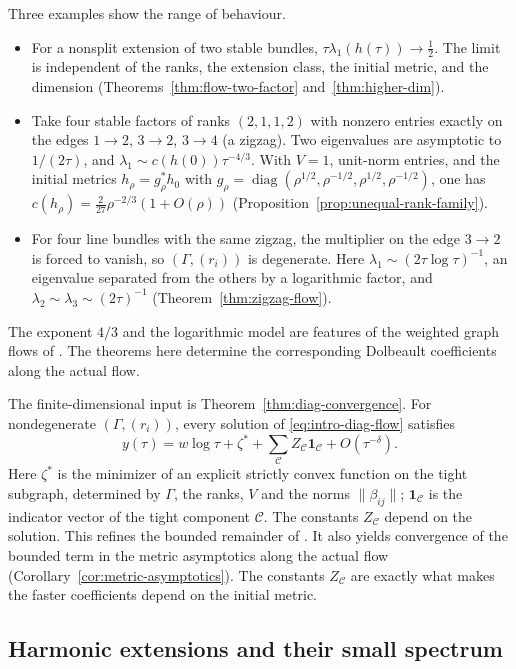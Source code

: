 \documentclass[11pt]{amsart}
\theoremstyle{definition}
\theoremstyle{remark}
\newcommand{\diag}{\operatorname{diag}}
\begin{document}
Three examples show the range of behaviour.
\begin{itemize}
\item For a nonsplit extension of two stable bundles,
 $\tau\lambda_1(h(\tau))\to\frac12$. The limit is independent of the ranks,
 the extension class, the initial metric, and the dimension
 (Theorems~\ref{thm:flow-two-factor} and~\ref{thm:higher-dim}).
\item Take four stable factors of ranks $(2,1,1,2)$ with nonzero entries
 exactly on the edges $1\to2$, $3\to2$, $3\to4$ (a zigzag). Two eigenvalues
 are asymptotic to $1/(2\tau)$, and $\lambda_1\sim c(h(0))\tau^{-4/3}$. With
 $V=1$, unit-norm entries, and the initial metrics $h_\rho=g_\rho^*h_0$ with
 $g_\rho=\diag(\rho^{1/2},\rho^{-1/2},\rho^{1/2},\rho^{-1/2})$, one has
 $c(h_\rho)=\frac2{27}\rho^{-2/3}(1+O(\rho))$
 (Proposition~\ref{prop:unequal-rank-family}).
\item For four line bundles with the same zigzag, the multiplier on the edge
 $3\to2$ is forced to vanish, so $(\Gamma,(r_i))$ is degenerate. Here
 $\lambda_1\sim(2\tau\log\tau)^{-1}$, an eigenvalue separated from the
 others by a logarithmic factor, and $\lambda_2\sim\lambda_3\sim(2\tau)^{-1}$
 (Theorem~\ref{thm:zigzag-flow}).
\end{itemize}
The exponent $4/3$ and the logarithmic model are features of the weighted
graph flows of \cite[Section~3.2 and Example~5.13]{HKKP2023}. The theorems
here determine the corresponding Dolbeault coefficients along the actual
flow.

The finite-dimensional input is Theorem~\ref{thm:diag-convergence}. For
nondegenerate $(\Gamma,(r_i))$, every solution of \eqref{eq:intro-diag-flow}
satisfies
\[
 y(\tau)=w\log\tau+\zeta^*+\sum_{\mathcal C}Z_{\mathcal C}\mathbf 1_{\mathcal C}
 +O(\tau^{-\delta}).
\]
Here $\zeta^*$ is the minimizer of an explicit strictly convex function on
the tight subgraph, determined by $\Gamma$, the ranks, $V$ and the norms
$\lVert\beta_{ij}\rVert$; $\mathbf 1_{\mathcal C}$ is the indicator vector
of the tight component $\mathcal C$. The constants $Z_{\mathcal C}$ depend on
the solution. This refines the bounded remainder of
\cite[Theorem~3.6]{HKKP2023}. It also yields convergence of the bounded term
in the metric asymptotics along the actual flow
(Corollary~\ref{cor:metric-asymptotics}). The constants $Z_{\mathcal C}$
are exactly what makes the faster coefficients depend on the initial metric.

\subsection{Harmonic extensions and their small spectrum}
\end{document}
